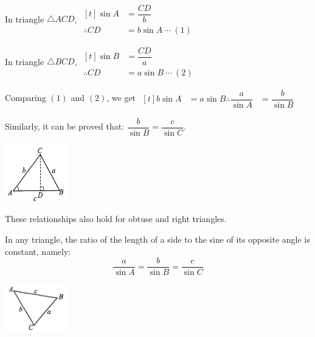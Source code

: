 \documentclass{report}
\begin{document}
\vspace{-2em}
\begin{vwcol}[widths={0.7,0.3}, sep=8mm, rule=0pt]
    ~
    
    In triangle $\triangle ACD$, $\begin{aligned}[t]
        \sin A&=\dfrac{CD}{b} \\
        \therefore CD&=b \sin A\ \cdots\ (1)
        \end{aligned}$
        
        In triangle $\triangle BCD$, $\begin{aligned}[t]
        \sin B &= \dfrac{CD}{a} \\
        \therefore CD &= a \sin B\ \cdots\ (2)
        \end{aligned}$
        
        Comparing $(1)$ and $(2)$, we get $\begin{aligned}[t]
            b \sin A&=a \sin B
            \therefore \dfrac{a}{\sin A}&=\dfrac{b}{\sin B}
        \end{aligned}$
        
        Similarly, it can be proved that: $\dfrac{b}{\sin B}=\dfrac{c}{\sin C}$.
        \vspace{3em}
        
        \parbox{0.2\textwidth}{
            \vspace{4em}
            \includegraphics[width=0.2\textwidth]{assets/10-2.jpg}
        }
\end{vwcol}
\vspace{-6em}
These relationships also hold for obtuse and right triangles.

\begin{info}
    \begin{vwcol}[widths={0.7,0.3}, sep=8mm, rule=0pt]
        In any triangle, the ratio of the length of a side to the sine of its opposite angle is constant, namely:
        $$\dfrac{a}{\sin A}=\dfrac{b}{\sin B}=\dfrac{c}{\sin C}$$

        \includegraphics[width=0.2\textwidth]{assets/10-3.jpg}
    \end{vwcol}
\end{info}
\end{document}
